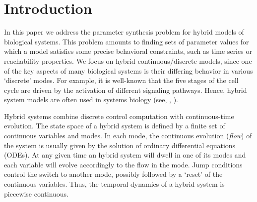 \section{Introduction}


In this paper we address the parameter synthesis problem for hybrid models of biological systems.
This problem amounts to finding sets of parameter values for which a model satisfies some precise 
behavioral constraints, such as time series or reachability properties. We focus on hybrid 
continuous/discrete models, since one of the key aspects of many biological systems is their differing 
behavior in various `discrete' modes. For example, it is well-known that the five stages of the cell 
cycle are driven by the activation of different signaling pathways. Hence, hybrid system models are often 
used in systems biology (see, \eg, 
\citep{tomlin04,Hu04,ye08,aihara10,antoniotti03,lincoln04,baldazzi11}).

Hybrid systems combine discrete control computation with continuous-time evolution. The state space 
of a hybrid system is defined by a finite set of continuous variables and modes. In each mode, the
continuous evolution ({\em flow}) of the system is usually given by the solution of ordinary differential
equations (ODEs). At any given time an hybrid system will dwell in one of its modes and each variable 
will evolve accordingly to the flow in the mode. Jump conditions control the switch to another mode,
possibly followed by a `reset' of the continuous variables. Thus, the temporal dynamics of a 
hybrid system is piecewise continuous.

